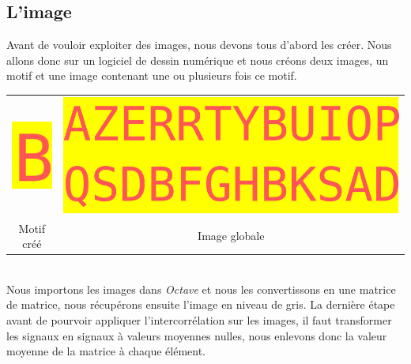 \documentclass[a4paper,12pt,titlepage]{report}
\newcommand{\octave}{\textit{Octave }}
\begin{document}
	\subsection{L'image}
	Avant de vouloir exploiter des images, nous devons tous d'abord les créer. Nous allons donc sur un logiciel de dessin numérique et nous créons deux images, un motif et une image contenant une ou plusieurs fois ce motif.\\
		\begin{tabular}{|c|c|}
			\includegraphics{../motif.png} & \includegraphics{../mot.png}\\
			Motif créé  & Image globale\\
		\end{tabular}\\
	Nous importons les images dans \octave et nous les convertissons en une matrice de matrice, nous récupérons ensuite l'image en niveau de gris. La dernière étape avant de pourvoir appliquer l'intercorrélation sur les images, il faut transformer les signaux en signaux à valeurs moyennes nulles, nous enlevons donc la valeur moyenne de la matrice à chaque élément.\\
\end{document}

